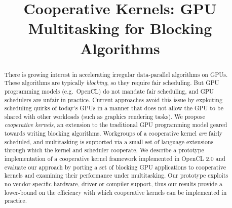 \documentclass[parskip=half,sigconf,review, anonymous=true, acmcopyrightmode=none]{acmart}
\makeatletter
\renewcommand\paragraph{\@startsection{paragraph}{4}{\z@}%
  {-.5\baselineskip \@plus -2\p@ \@minus -.2\p@}%
  {-3.5\p@}%
  {\bfseries\@parfont}}
\makeatother
\begin{document}
\title{Cooperative Kernels: GPU Multitasking for Blocking Algorithms}

\begin{abstract}
There is growing interest in accelerating irregular data-parallel
algorithms on GPUs.  These algorithms are typically \emph{blocking},
so they require fair scheduling.  But GPU programming models
(e.g.\ OpenCL) do not mandate fair scheduling, and GPU schedulers are
unfair in practice.  Current approaches avoid this issue by exploiting
scheduling quirks of today's GPUs in a manner that does not allow the
GPU to be shared with other workloads (such as graphics rendering
tasks).  We propose \emph{cooperative kernels}, an extension to the
traditional GPU programming model geared towards writing blocking
algorithms.  Workgroups of a cooperative kernel \emph{are} fairly
scheduled, and multitasking is supported via a small set of language
extensions through which the kernel and scheduler cooperate.  We
describe a prototype implementation of a cooperative kernel framework
implemented in OpenCL 2.0 and evaluate our approach by porting a set
of blocking GPU applications to cooperative kernels and examining
their performance under multitasking.  Our prototype exploits no
vendor-specific hardware, driver or compiler support, thus our results
provide a lower-bound on the efficiency with which cooperative kernels
can be implemented in practice.

\end{abstract}


%
%





\maketitle

\newcommand{\myparagraph}[1]{\paragraph{#1}}
    
\end{document}
